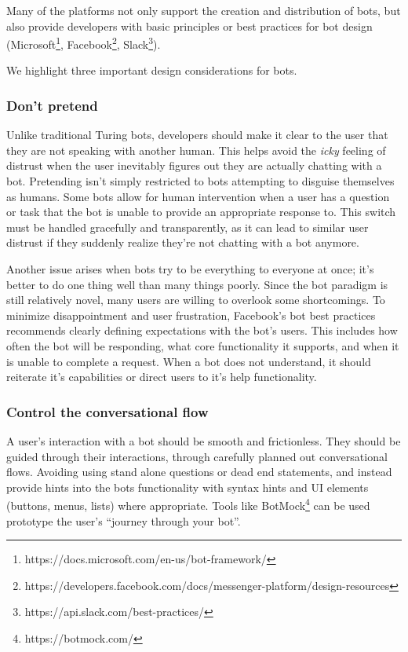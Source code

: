 \documentclass{sig-alternate}
\begin{document}
	Many of the platforms not only support the creation and distribution of bots, but also provide developers with basic principles or best practices for bot design (Microsoft\footnote{https://docs.microsoft.com/en-us/bot-framework/}, Facebook\footnote{https://developers.facebook.com/docs/messenger-platform/design-resources}, Slack\footnote{https://api.slack.com/best-practices/}).

	We highlight three important design considerations for bots.

	\subsubsection{Don't pretend}

	Unlike traditional Turing bots, developers should make it clear to the user that they are not speaking with another human. This helps avoid the \emph{icky} feeling of distrust when the user inevitably figures out they are actually chatting with a bot.  
	Pretending isn't simply restricted to bots attempting to disguise themselves as humans. Some bots allow for human intervention when a user has a question or task that the bot is unable to provide an appropriate response to.  This switch must be handled gracefully and transparently, as it can lead to similar user distrust if they suddenly realize they're not chatting with a bot anymore.

	Another issue arises when bots try to be everything to everyone at once; it's better to do one thing well than many things poorly. Since the bot paradigm is still relatively novel, many users are willing to overlook some shortcomings.  To minimize disappointment and user frustration, Facebook's bot best practices recommends clearly defining expectations with the bot's users. This includes how often the bot will be responding, what core functionality it supports, and when it is unable to complete a request.  When a bot does not understand, it should reiterate it's capabilities or direct users to it's help functionality.


	\subsubsection{Control the conversational flow}

	A user's interaction with a bot should be smooth and frictionless. They should be guided through their interactions, through carefully planned out conversational flows. Avoiding using stand alone questions or dead end statements, and instead provide hints into the bots functionality with syntax hints and UI elements (buttons, menus, lists) where appropriate. Tools like BotMock\footnote{https://botmock.com/} can be used prototype the user's ``journey through your bot''.
\end{document}
